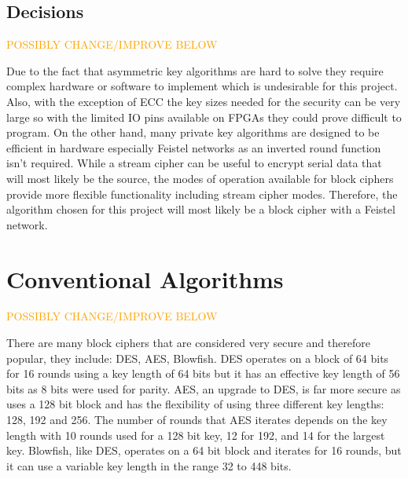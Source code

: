 \documentclass[12pt,twoside,a4paper]{report}
\begin{document}
    \subsection{Decisions}
    \label{section:cryp_decisions}
    
    \textcolor{orange}{POSSIBLY CHANGE/IMPROVE BELOW}
    
	Due to the fact that asymmetric key algorithms are hard to solve they require complex hardware or software to implement which is undesirable for this project. Also, with the exception of ECC the key sizes needed for the security can be very large so with the limited IO pins available on FPGAs they could prove difficult to program. On the other hand, many private key algorithms are designed to be efficient in hardware especially Feistel networks as an inverted round function isn't required. While a stream cipher can be useful to encrypt serial data that will most likely be the source, the modes of operation available for block ciphers provide more flexible functionality including stream cipher modes. Therefore, the algorithm chosen for this project will most likely be a block cipher with a Feistel network.
    
	\section{Conventional Algorithms}

	\textcolor{orange}{POSSIBLY CHANGE/IMPROVE BELOW}
    
	There are many block ciphers that are considered very secure and therefore popular, they include: DES\cite{ComputerSecurityDivision1999}, AES\cite{ComputerSecurityDivision2001}, Blowfish\cite{BruceSchneier1994}. DES operates on a block of 64 bits for 16 rounds using a key length of 64 bits but it has an effective key length of 56 bits as 8 bits were used for parity. AES, an upgrade to DES, is far more secure as uses a 128 bit block and has the flexibility of using three different key lengths: 128, 192 and 256. The number of rounds that AES iterates depends on the key length with 10 rounds used for a 128 bit key, 12 for 192, and 14 for the largest key. Blowfish, like DES, operates on a 64 bit block and iterates for 16 rounds, but it can use a variable key length in the range 32 to 448 bits.
    
\end{document}
